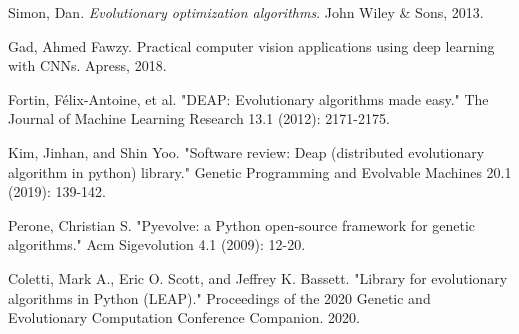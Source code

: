 \documentclass[conference]{IEEEtran}
\begin{document}
%
%
%
\begin{thebibliography}{1}

Simon, Dan. \emph{Evolutionary optimization algorithms}. John Wiley \& Sons, 2013.

Gad, Ahmed Fawzy. Practical computer vision applications using deep learning with CNNs. Apress, 2018.

Fortin, Félix-Antoine, et al. "DEAP: Evolutionary algorithms made easy." The Journal of Machine Learning Research 13.1 (2012): 2171-2175.

Kim, Jinhan, and Shin Yoo. "Software review: Deap (distributed evolutionary algorithm in python) library." Genetic Programming and Evolvable Machines 20.1 (2019): 139-142.

Perone, Christian S. "Pyevolve: a Python open-source framework for genetic algorithms." Acm Sigevolution 4.1 (2009): 12-20.

Coletti, Mark A., Eric O. Scott, and Jeffrey K. Bassett. "Library for evolutionary algorithms in Python (LEAP)." Proceedings of the 2020 Genetic and Evolutionary Computation Conference Companion. 2020.

\end{thebibliography}
\end{document}
